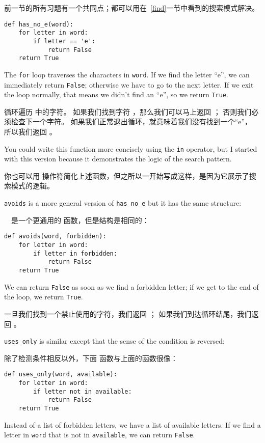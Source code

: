 前一节的所有习题有一个共同点；都可以用在~\ref{find}一节中看到的搜索模式解决。

\begin{lstlisting}
def has_no_e(word):
    for letter in word:
        if letter == 'e':
            return False
    return True
\end{lstlisting}
%
The {\tt for} loop traverses the characters in {\tt word}.  If we find
the letter ``e'', we can immediately return {\tt False}; otherwise we
have to go to the next letter.  If we exit the loop normally, that
means we didn't find an ``e'', so we return {\tt True}.

 循环遍历  中的字符。
如果我们找到字符 ，那么我们可以马上返回  ；
否则我们必须检查下一个字符。
如果我们正常退出循环，就意味着我们没有找到一个“e”， 所以我们返回  。


  

You could write this function more concisely using the {\tt in}
operator, but I started with this version because it
demonstrates the logic of the search pattern.

你也可以用  操作符简化上述函数，但之所以一开始写成这样，是因为它展示了搜索模式的逻辑。


{\tt avoids} is a more general version of \verb"has_no_e" but it
has the same structure:

　是一个更通用的  函数，但是结构是相同的：

\begin{lstlisting}
def avoids(word, forbidden):
    for letter in word:
        if letter in forbidden:
            return False
    return True
\end{lstlisting}

%
We can return {\tt False} as soon as we find a forbidden letter;
if we get to the end of the loop, we return {\tt True}.

一旦我们找到一个禁止使用的字符，我们返回  ；
如果我们到达循环结尾，我们返回  。

\verb"uses_only" is similar except that the sense of the condition
is reversed:

除了检测条件相反以外，下面  函数与上面的函数很像：

\begin{lstlisting}
def uses_only(word, available):
    for letter in word:
        if letter not in available:
            return False
    return True
\end{lstlisting}
%
Instead of a list of forbidden letters, we have a list of available
letters.  If we find a letter in {\tt word} that is not in
{\tt available}, we can return {\tt False}.

